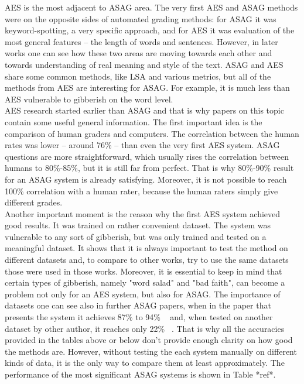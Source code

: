 AES is the most adjacent to ASAG area. The very first AES and ASAG methods were on the opposite sides of automated grading methods: for ASAG it was keyword-spotting, a very specific approach, and for AES it was evaluation of the most general features -- the length of words and sentences. However, in later works one can see how these two areas are moving towards each other and towards understanding of real meaning and style of the text. ASAG and AES share some common methods, like LSA and various metrics, but all of the methods from AES are interesting for ASAG. For example, it is much less than AES vulnerable to gibberish on the word level. \\

AES research started earlier than ASAG and that is why papers on this topic contain some useful general information. The first important idea is the comparison of human graders and computers. The correlation between the human rates was lower -- around 76\% -- than even the very first AES system. ASAG questions are more straightforward, which usually rises the correlation between humans to 80\%-85\%, but it is still far from perfect. That is why 80\%-90\% result for an ASAG system is already satisfying. Moreover, it is not possible to reach 100\% correlation with a human rater, because the human raters simply give different grades.\\

Another important moment is the reason why the first AES system achieved good results. It was trained on rather convenient dataset. The system was vulnerable to any sort of gibberish, but was only trained and tested on a meaningful dataset. It shows that it is always important to test the method on different datasets and, to compare to other works, try to use the same datasets those were used in those works. Moreover, it is essential to keep in mind that certain types of gibberish, namely "word salad" and "bad faith", can become a problem not only for an AES system, but also for ASAG. The importance of datasets one can see also in further ASAG papers, when in the paper that presents the system it achieves 87\% to 94\% ~\cite{c-rater} and, when tested on another dataset by other author, it reaches only 22\% ~\cite{Mohler}. That is why all the accuracies provided in the tables above or below don't provide enough clarity on how good the methods are. However, without testing the each system manually on different kinds of data, it is the only way to compare them at least approximately. The performance of the most significant ASAG systems is shown in Table *ref*.

